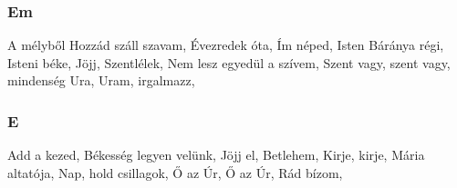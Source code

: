 \begin{multicols}{2}
\begin{minipage}{\textwidth}
\end{minipage}
\begin{minipage}{\textwidth}
\subsubsection*{Em}
A mélyből Hozzád száll szavam, \pageref{AmC3A9lybC591lHozzC3A1dszC3A1llszavam}\newline
Évezredek óta, \pageref{C389vezredekC3B3ta}\newline
Ím néped, \pageref{C38DmnC3A9ped}\newline
Isten Báránya régi, \pageref{IstenBC3A1rC3A1nyarC3A9gi}\newline
Isteni béke, \pageref{IstenibC3A9ke}\newline
Jöjj, Szentlélek, \pageref{JC3B6jj2CSzentlC3A9lek}\newline
Nem lesz egyedül a szívem, \pageref{NemleszegyedC3BClaszC3ADvem}\newline
Szent vagy, szent vagy, mindenség Ura, \pageref{Szentvagy2Cszentvagy2CmindensC3A9gUra}\newline
Uram, irgalmazz, \pageref{Uram2Cirgalmazz}\newline

\end{minipage}
\begin{minipage}{\textwidth}
\subsubsection*{E}
Add a kezed, \pageref{Addakezed}\newline
Békesség legyen velünk, \pageref{BC3A9kessC3A9glegyenvelC3BCnk}\newline
Jöjj el, Betlehem, \pageref{JC3B6jjel2CBetlehem}\newline
Kirje, kirje, \pageref{Kirje2Ckirje}\newline
Mária altatója, \pageref{MC3A1riaaltatC3B3ja}\newline
Nap, hold csillagok, \pageref{Nap2Choldcsillagok}\newline
Ő az Úr, Ő az Úr, \pageref{C590azC39Ar2CC590azC39Ar}\newline
Rád bízom, \pageref{RC3A1dbC3ADzom}\newline

\end{minipage}
\begin{minipage}{\textwidth}

\end{minipage}
\end{multicols}
